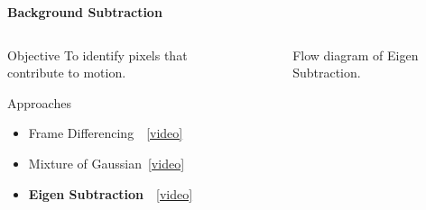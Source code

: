 \begin{frame}{\textbf{Background Subtraction}}

\begin{columns}
	\begin{column}{0.48\textwidth}
		\begin{varblock}[\textwidth]{Objective}
			To identify pixels that contribute to motion.
		\end{varblock}
		\begin{varblock}[\textwidth]{Approaches\cite{piccardi}}
			\begin{itemize}							
				\item Frame Differencing~~\href{run:videos/bgsub/fd.avi}{{\color{red}[video]}}
				\item Mixture of Gaussian~\href{run:videos/bgsub/mog.avi}{{\color{red}[video]}}
				\item \textbf{\color{blue}Eigen Subtraction}~~\href{run:videos/bgsub/es.avi}{{\color{red}[video]}}		
			\end{itemize}
		\end{varblock}
	\end{column}
	\begin{column}{0.49\textwidth}
		\begin{figure}
			\centering
			\caption{Flow diagram of Eigen Subtraction.}
		\end{figure}
	\end{column}
\end{columns}
\end{frame}